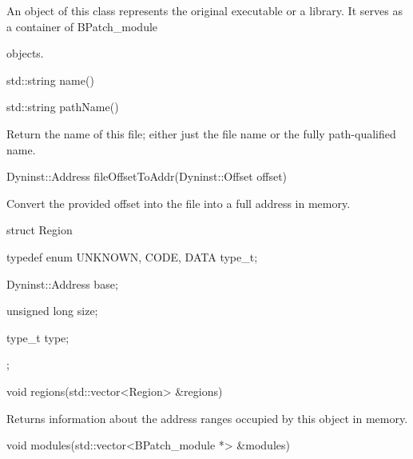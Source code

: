 {

An object of this class represents the original executable or a library. It serves as a container of BPatch_module

objects.}



{

std::string name()}



{

std::string pathName()}



{

Return the name of this file; either just the file name or the fully path-qualified name.



{

Dyninst::Address fileOffsetToAddr(Dyninst::Offset offset)}



{

Convert the provided offset into the file into a full address in memory.



{

struct Region {}



{

typedef enum { UNKNOWN, CODE, DATA } type_t;}



{

Dyninst::Address base;}



{

unsigned long size;}



{

type_t type;}



{

};}



{

void regions(std::vector<Region> &regions)}



{

Returns information about the address ranges occupied by this object in memory.



{

void modules(std::vector<BPatch_module *> &modules)}



}}}
